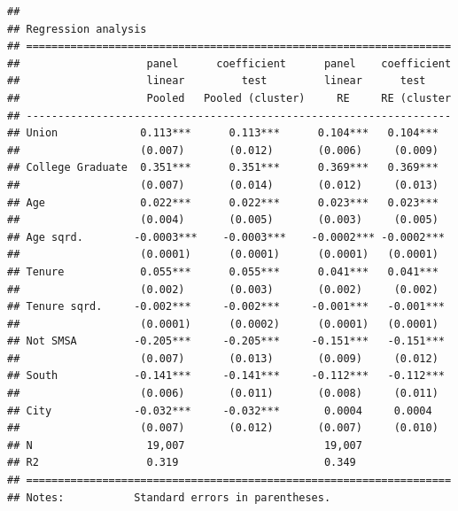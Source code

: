 \documentclass[
]{article}
\begin{document}
\begin{verbatim}
## 
## Regression analysis
## ===================================================================
##                    panel      coefficient      panel    coefficient
##                    linear         test         linear      test    
##                    Pooled   Pooled (cluster)     RE     RE (cluster
## -------------------------------------------------------------------
## Union             0.113***      0.113***      0.104***   0.104***  
##                   (0.007)       (0.012)       (0.006)     (0.009)  
## College Graduate  0.351***      0.351***      0.369***   0.369***  
##                   (0.007)       (0.014)       (0.012)     (0.013)  
## Age               0.022***      0.022***      0.023***   0.023***  
##                   (0.004)       (0.005)       (0.003)     (0.005)  
## Age sqrd.        -0.0003***    -0.0003***    -0.0002*** -0.0002*** 
##                   (0.0001)      (0.0001)      (0.0001)   (0.0001)  
## Tenure            0.055***      0.055***      0.041***   0.041***  
##                   (0.002)       (0.003)       (0.002)     (0.002)  
## Tenure sqrd.     -0.002***     -0.002***     -0.001***   -0.001*** 
##                   (0.0001)      (0.0002)      (0.0001)   (0.0001)  
## Not SMSA         -0.205***     -0.205***     -0.151***   -0.151*** 
##                   (0.007)       (0.013)       (0.009)     (0.012)  
## South            -0.141***     -0.141***     -0.112***   -0.112*** 
##                   (0.006)       (0.011)       (0.008)     (0.011)  
## City             -0.032***     -0.032***       0.0004     0.0004   
##                   (0.007)       (0.012)       (0.007)     (0.010)  
## N                  19,007                      19,007              
## R2                 0.319                       0.349               
## ===================================================================
## Notes:           Standard errors in parentheses.
\end{verbatim}
\end{document}

